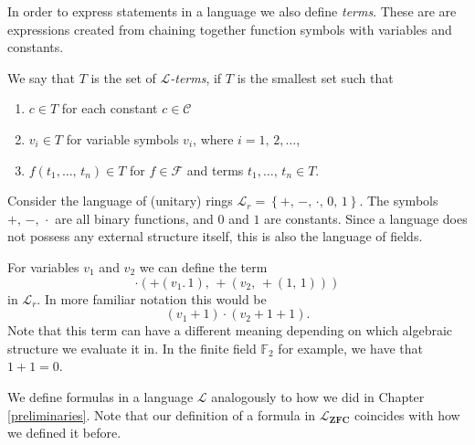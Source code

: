 \documentclass[../../main.tex]{subfiles}
\begin{document}
In order to express statements in a language we also define \textit{terms}.
These are are expressions created from chaining together function symbols with variables and constants.

\begin{definition}\label{term-def}\cite[Definition 1.1.4]{Mar02}
    We say that $T$ is the set of \emph{$\mathcal{L}$-terms}, if $T$ is the smallest set such that
    \begin{enumerate}[label=(\roman*)]
        \item $c \in T$ for each constant $c \in \mathcal{C}$
        \item $v_i \in T$ for variable symbols $v_i$, where $i = 1,\, 2,\ldots$,
        \item $f(t_1,\ldots,\, t_n) \in T$ for $f \in \mathcal{F}$ and terms $t_1,\ldots,\, t_n \in T$.
    \end{enumerate}
\end{definition}

\begin{example}
    Consider the language of (unitary) rings $\mathcal{L}_r = \left\{+,\, -,\, \cdot,\, 0,\, 1\right\}$.
    The symbols $+,\, -,\, \cdot$ are all binary functions, and $0$ and $1$ are constants.
    Since a language does not possess any external structure itself, this is also the language of fields.

    For variables $v_1$ and $v_2$ we can define the term
    $$\cdot \left(+ \left(v_1.\, 1\right),\, +\left(v_2,\, +\left(1,\, 1\right)\right)\right)$$
    in $\mathcal{L}_r$.
    In more familiar notation this would be
    $$\left(v_1 + 1\right) \cdot \left(v_2 + 1 + 1\right).$$
    Note that this term can have a different meaning depending on which algebraic structure we evaluate it in.
    In the finite field $\mathbb{F}_2$ for example, we have that $1 + 1 = 0$.
\end{example}

We define formulas in a language $\mathcal{L}$ analogously to how we did in Chapter \ref{preliminaries}.
Note that our definition of a formula in $\mathcal{L}_{\textbf{ZFC}}$ coincides with how we defined it before.
\end{document}
